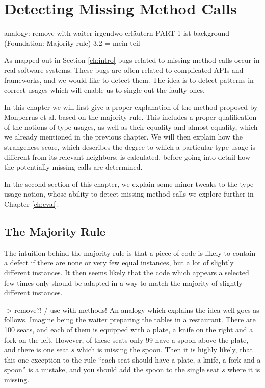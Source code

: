 \chapter{Detecting Missing Method Calls}\label{ch:dmmc}

analogy: remove with waiter
irgendwo erläutern PART 1 ist background (Foundation: Majority rule)
3.2 = mein teil


As mapped out in Section \ref{ch:intro} bugs related to missing method calls occur in real software systems.
These bugs are often related to complicated APIs and frameworks, and we would like to detect them.
The idea is to detect patterns in correct usages which will enable us to single out the faulty ones.

In this chapter we will first give a proper explanation of the method proposed by Monperrus et al. \cite{monperrus2010detecting}\cite{monperrus2013detecting} based on the majority rule.
This includes a proper qualification of the notions of type usages, as well as their equality and almost equality, which we already mentioned in the previous chapter.
We will then explain how the strangeness score, which describes the degree to which a particular type usage is different from its relevant neighbors, is calculated, before going into detail how the potentially missing calls are determined.

In the second section of this chapter, we explain some minor tweaks to the type usage notion, whose ability to detect missing method calls we explore further in Chapter \ref{ch:eval}.

\section{The Majority Rule}

The intuition behind the majority rule is that a piece of code is likely to contain a defect if there are none or very few equal instances, but a lot of slightly different instances.
It then seems likely that the code which appears a selected few times only should be adapted in a way to match the majority of slightly different instances.

-> remove?! / use with methods!
An analogy which explains the idea well goes as follows.
Imagine being the waiter preparing the tables in a restaurant.
There are 100 seats, and each of them is equipped with a plate, a knife on the right and a fork on the left.
However, of these seats only 99 have a spoon above the plate, and there is one seat $s$ which is missing the spoon.
Then it is highly likely, that this one exception to the rule ``each seat should have a plate, a knife, a fork and a spoon'' is a mistake, and you should add the spoon to the single seat $s$ where it is missing.

